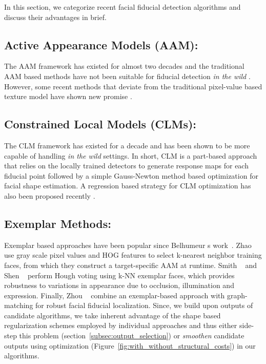 \label{sec:related_work}

In this section, we categorize recent facial fiducial detection algorithms and discuss their advantages in brief.
\subsection{Active Appearance Models (AAM):}
The AAM framework has existed for almost two decades \cite{edwa_tayl_coot1998,Baker03} and the traditional AAM based
methods have not been suitable for fiducial detection \emph{in the wild} \cite{Saragih_PR2009,gross2005generic}. However, some recent methods that deviate from the traditional 
pixel-value based texture model have shown new promise \cite{antonakos2014hog,asthana_pami_2015}.   
\subsection{Constrained Local Models (CLMs):}
The CLM framework has existed for a decade \cite{Cristinacce2006,Saragih2011_1} and has been shown
to be more
capable of handling \emph{in the wild} settings. In short, CLM is a part-based approach that relies on the
locally trained detectors to generate response maps for each fiducial point followed by a simple Gauss-Newton
method based optimization \cite{Saragih2011_1} for facial shape estimation. A regression based strategy for CLM
optimization has also been proposed recently \cite{akshay_CVPR_2013}.
\subsection{Exemplar Methods:}
Exemplar based approaches have been popular since Belhumeur \etal \textquotesingle s
work~\cite{kumarPAMI13_faceExem}. Zhao \etal~\cite{zhaoACCV12_AAM} use gray scale pixel values and HOG features
to select k-nearest neighbor training faces, from which they construct a target-specific AAM at
runtime. Smith \etal~\cite{smithCVPR14_Context} and Shen \etal~\cite{shenCVPR13_retrieval} perform Hough voting
using k-NN exemplar faces, which provides
robustness to variations in appearance due to occlusion, illumination and expression. Finally,
Zhou \etal~\cite{zhouICCV13_EGM} combine an exemplar-based approach with graph-matching for robust facial fiducial 
localization. Since, we build upon outputs of candidate algorithms, we take inherent advantage
of the shape based regularization schemes employed by individual approaches and thus either side-step
this problem (section~\ref{subsec:output_selection}) or \emph{smoothen} candidate outputs using
optimization (Figure~\ref{fig:with_without_structural_costs}) in our algorithms.

